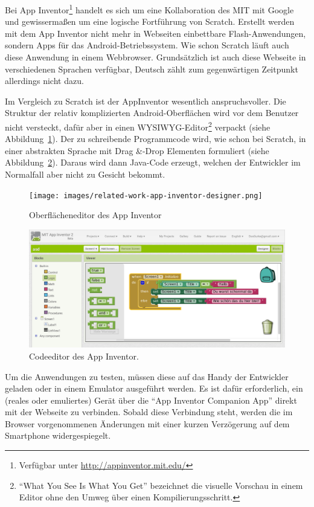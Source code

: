 Bei App Inventor\footnote{Verfügbar unter \url{http://appinventor.mit.edu/}} handelt es sich um eine Kollaboration des MIT mit Google und gewissermaßen um eine logische Fortführung von Scratch. Erstellt werden mit dem App Inventor nicht mehr in Webseiten einbettbare Flash-Anwendungen, sondern Apps für das Android-Betriebssystem. Wie schon Scratch läuft auch diese Anwendung in einem Webbrowser. Grundsätzlich ist auch diese Webseite in verschiedenen Sprachen verfügbar, Deutsch zählt zum gegenwärtigen Zeitpunkt allerdings nicht dazu.

Im Vergleich zu Scratch ist der AppInventor wesentlich anspruchsvoller. Die Struktur der relativ komplizierten Android-Oberflächen wird vor dem Benutzer nicht versteckt, dafür aber in einen WYSIWYG-Editor\footnote{"`What You See Is What You Get"' bezeichnet die visuelle Vorschau in einem Editor ohne den Umweg über einen Kompilierungsschritt.} verpackt (siehe Abbildung~\ref{fig:app-inventor-ui-designer}). Der zu schreibende Programmcode wird, wie schon bei Scratch, in einer abstrakten Sprache mit Drag \&-Drop Elementen formuliert (siehe Abbildung~\ref{fig:app-inventor-block-designer}). Daraus wird dann Java-Code erzeugt, welchen der Entwickler im Normalfall aber nicht zu Gesicht bekommt.

\begin{figure}[h]
  \centering \texttt{[image: images/related-work-app-inventor-designer.png]}
  \caption{Oberflächeneditor des App Inventor}
  \label{fig:app-inventor-ui-designer}
\end{figure}

\begin{figure}[h]
  \centering \includegraphics[width=\textwidth]{images/related-work-app-inventor-blocks.png}
  \caption{Codeeditor des App Inventor.}
  \label{fig:app-inventor-block-designer}
\end{figure}

Um die Anwendungen zu testen, müssen diese auf das Handy der Entwickler geladen oder in einem Emulator ausgeführt werden. Es ist dafür erforderlich, ein (reales oder emuliertes) Gerät über die "`App Inventor Companion App"' direkt mit der Webseite zu verbinden. Sobald diese Verbindung steht, werden die im Browser vorgenommenen Änderungen mit einer kurzen Verzögerung auf dem Smartphone widergespiegelt.

